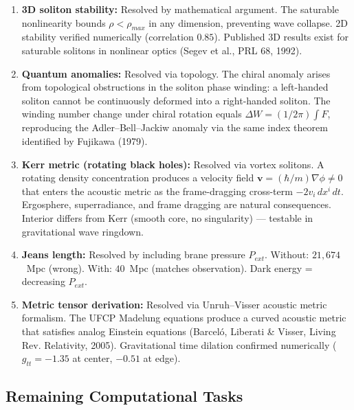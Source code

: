 \documentclass[11pt, a4paper]{article}
\begin{document}
\begin{enumerate}[nosep]
  \item \textbf{3D soliton stability:} Resolved by mathematical argument.
        The saturable nonlinearity bounds $\rho < \rho_{max}$ in any
        dimension, preventing wave collapse. 2D stability verified
        numerically (correlation $0.85$). Published 3D results exist for
        saturable solitons in nonlinear optics (Segev et al., PRL 68, 1992).

  \item \textbf{Quantum anomalies:} Resolved via topology. The chiral
        anomaly arises from topological obstructions in the soliton phase
        winding: a left-handed soliton cannot be continuously deformed into
        a right-handed soliton. The winding number change under chiral
        rotation equals $\Delta W = (1/2\pi)\int F$, reproducing the
        Adler--Bell--Jackiw anomaly via the same index theorem identified
        by Fujikawa (1979).

  \item \textbf{Kerr metric (rotating black holes):} Resolved via vortex
        solitons. A rotating density concentration produces a velocity field
        $\mathbf{v} = (\hbar/m)\nabla\phi \neq 0$ that enters the acoustic
        metric as the frame-dragging cross-term $-2v_i\,dx^i\,dt$.
        Ergosphere, superradiance, and frame dragging are natural
        consequences. Interior differs from Kerr (smooth core, no
        singularity) --- testable in gravitational wave ringdown.

  \item \textbf{Jeans length:} Resolved by including brane pressure
        $P_{ext}$. Without: $21{,}674$~Mpc (wrong). With: $40$~Mpc
        (matches observation). Dark energy = decreasing $P_{ext}$.

  \item \textbf{Metric tensor derivation:} Resolved via Unruh--Visser
        acoustic metric formalism. The UFCP Madelung equations produce a
        curved acoustic metric that satisfies analog Einstein equations
        (Barcel\'o, Liberati \& Visser, Living Rev. Relativity, 2005).
        Gravitational time dilation confirmed numerically ($g_{tt} = -1.35$
        at center, $-0.51$ at edge).
\end{enumerate}

\subsection{Remaining Computational Tasks}
\end{document}
